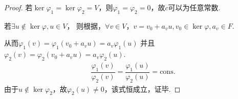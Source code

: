 \begin{proof}
    若\(\ker \varphi_1=\ker \varphi_2=V\)，则\(\varphi_1=\varphi_2=0\)，故\(c\)可以为任意常数.

    若\(\exists u \notin \ker \varphi,u \in V\)，
    则根据，\(\forall v \in V\)，\(v=v_0+a_vu,v_0 \in \ker \varphi,a_v \in F\).
    
    从而\(\varphi_1(v)=\varphi_1(v_0+a_vu)=a_v \varphi_1(u)\)
    并且\(\varphi_2(v)=\varphi_2(v_0+a_vu)=a_v \varphi_2(u)\).
    \begin{align*}
        \dfrac{\varphi_1(v)}{\varphi_2(v)}=\dfrac{\varphi_1(u)}{\varphi_2(u)}=\mathrm{cons.}
    \end{align*}
    由于\(u \notin \ker \varphi_2\)，故\(\varphi_2(u) \ne 0\)，该式恒成立，证毕.    
\end{proof}

